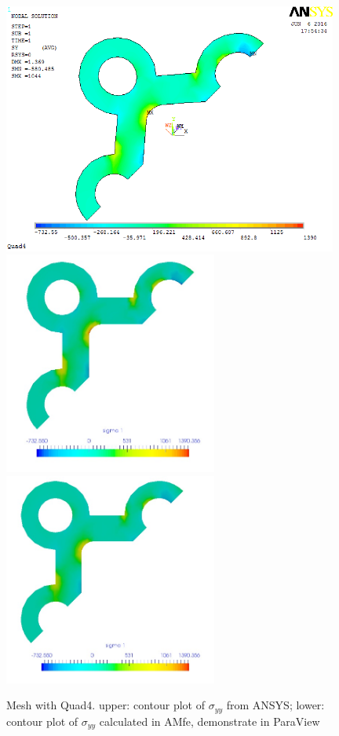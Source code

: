\begin{figure}[htbp]
	\begin{center}
		\includegraphics[width=11cm,clip]{Quad4_Syy.png} 
		\includegraphics[width=7cm,clip]{Quad4_Syy_PD.png} 			
		\includegraphics[width=7cm,clip]{Quad4_Syy_P.png} 		
		\caption{Mesh with Quad4. upper: contour plot of $\sigma_{yy}$ from ANSYS; lower: contour plot of $\sigma_{yy}$ calculated in AMfe, demonstrate in ParaView} \label{fig: Quad4_Syy}
	\end{center}
\end{figure}
\clearpage 

